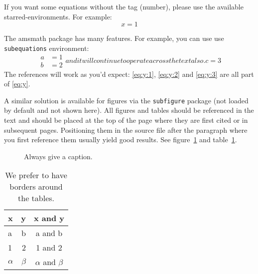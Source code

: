 \documentclass[a4paper,11pt]{article}
\begin{document}
If you want some equations without the tag (number), please use the available
starred-environments. For example:
\begin{equation*}
x = 1
\end{equation*}

The amsmath package has many features. For example, you can use use
\texttt{subequations} environment:
\begin{subequations}\label{eq:y}
\begin{align}
\label{eq:y:1}
a & = 1
\\
\label{eq:y:2}
b & = 2
\end{align}
and it will continue to operate across the text also.
\begin{equation}
\label{eq:y:3}
c = 3
\end{equation}
\end{subequations}
The references will work as you'd expect: \eqref{eq:y:1},
\eqref{eq:y:2} and \eqref{eq:y:3} are all part of \eqref{eq:y}.

A similar solution is available for figures via the \texttt{subfigure}
package (not loaded by default and not shown here).
All figures and tables should be referenced in the text and should be
placed at the top of the page where they are first cited or in
subsequent pages. Positioning them in the source file
after the paragraph where you first reference them usually yield good
results. See figure~\ref{fig:i} and table~\ref{tab:i}.

\begin{figure}[tbp]
\centering %
\hfill
\caption{\label{fig:i} Always give a caption.}
\end{figure}

\begin{table}[tbp]
\centering
\begin{tabular}{|lr|c|}
\hline
x&y&x and y\\
\hline
a & b & a and b\\
1 & 2 & 1 and 2\\
$\alpha$ & $\beta$ & $\alpha$ and $\beta$\\
\hline
\end{tabular}
\caption{\label{tab:i} We prefer to have borders around the tables.}
\end{table}
\end{document}
